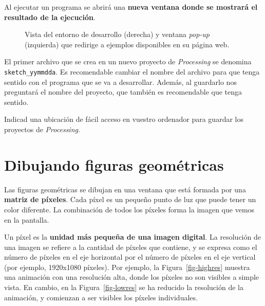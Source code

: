 \documentclass[
  spanish,
  11pt,
  a4paper,
  DIV=11,
  numbers=noendperiod]{scrartcl}
\begin{document}
Al ejecutar un programa se abrirá una \textbf{nueva ventana donde se mostrará el resultado de la ejecución}.

\begin{figure}

\caption{\label{fig-ide}Vista del entorno de desarrollo (derecha) y ventana \emph{pop-up} (izquierda) que redirige a ejemplos disponibles en su página web.}

\end{figure}%

\begin{tcolorbox}[enhanced jigsaw, toprule=.15mm, coltitle=black, titlerule=0mm, opacitybacktitle=0.6, breakable, colback=white, colframe=quarto-callout-warning-color-frame, colbacktitle=quarto-callout-warning-color!10!white, opacityback=0, title={Advertencia}, bottomtitle=1mm, rightrule=.15mm, toptitle=1mm, left=2mm, bottomrule=.15mm, leftrule=.75mm, arc=.35mm]

El primer archivo que se crea en un nuevo proyecto de \emph{Processing} se denomina \texttt{sketch\_yymmdda}. Es recomendable cambiar el nombre del archivo para que tenga sentido con el programa que se va a desarrollar. Además, al guardarlo nos preguntará el nombre del proyecto, que también es recomendable que tenga sentido.

Indicad una ubicación de fácil acceso en vuestro ordenador para guardar los proyectos de \emph{Processing}.

\end{tcolorbox}

\section{Dibujando figuras geométricas}

\label{dibujando-figuras-geométricas}

Las figuras geométricas se dibujan en una ventana que está formada por una \textbf{matriz de píxeles}. Cada píxel es un pequeño punto de luz que puede tener un color diferente. La combinación de todos los píxeles forma la imagen que vemos en la pantalla.

Un píxel es la \textbf{unidad más pequeña de una imagen digital}. La resolución de una imagen se refiere a la cantidad de píxeles que contiene, y se expresa como el número de píxeles en el eje horizontal por el número de píxeles en el eje vertical (por ejemplo, 1920x1080 píxeles). Por ejemplo, la Figura~\ref{fig-highres} muestra una animación con una resolución alta, donde los píxeles no son visibles a simple vista. En cambio, en la Figura~\ref{fig-lowres} se ha reducido la resolución de la animación, y comienzan a ser visibles los píxeles individuales.
\end{document}
